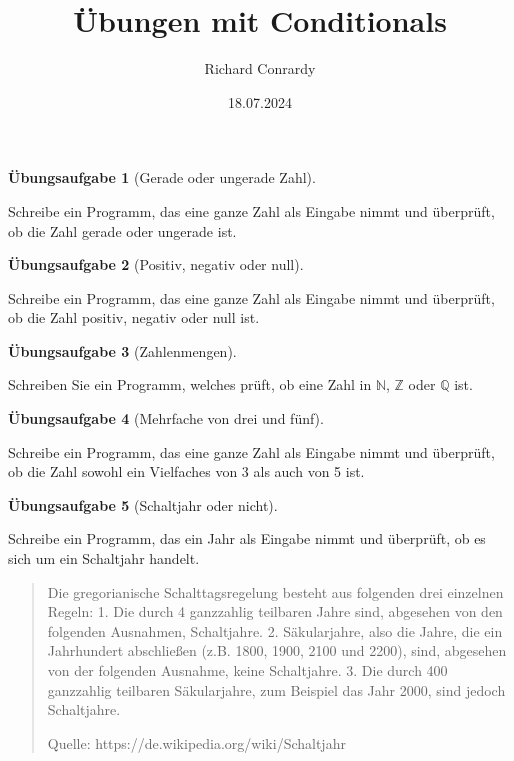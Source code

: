 \documentclass[
  10pt,
  a4paper,
  DIV=11]{scrartcl}
\title{Übungen mit Conditionals}
\author{Richard Conrardy}
\date{18.07.2024}
\theoremstyle{definition}
\newtheorem{exercise}{Übungsaufgabe}[section]
\theoremstyle{remark}
\begin{document}
\maketitle

\begin{exercise}[Gerade oder ungerade
Zahl]\protect\hypertarget{exr-line}{}\label{exr-line}

Schreibe ein Programm, das eine ganze Zahl als Eingabe nimmt und
überprüft, ob die Zahl gerade oder ungerade ist.

\end{exercise}

\begin{exercise}[Positiv, negativ oder
null]\protect\hypertarget{exr-line}{}\label{exr-line}

Schreibe ein Programm, das eine ganze Zahl als Eingabe nimmt und
überprüft, ob die Zahl positiv, negativ oder null ist.

\end{exercise}

\begin{exercise}[Zahlenmengen]\protect\hypertarget{exr-line}{}\label{exr-line}

Schreiben Sie ein Programm, welches prüft, ob eine Zahl in
\(\mathbb{N}\), \(\mathbb{Z}\) oder \(\mathbb{Q}\) ist.

\end{exercise}

\begin{exercise}[Mehrfache von drei und
fünf]\protect\hypertarget{exr-line}{}\label{exr-line}

Schreibe ein Programm, das eine ganze Zahl als Eingabe nimmt und
überprüft, ob die Zahl sowohl ein Vielfaches von 3 als auch von 5 ist.

\end{exercise}

\begin{exercise}[Schaltjahr oder
nicht]\protect\hypertarget{exr-line}{}\label{exr-line}

Schreibe ein Programm, das ein Jahr als Eingabe nimmt und überprüft, ob
es sich um ein Schaltjahr handelt.

\begin{quote}
Die gregorianische Schalttagsregelung besteht aus folgenden drei
einzelnen Regeln: 1. Die durch 4 ganzzahlig teilbaren Jahre sind,
abgesehen von den folgenden Ausnahmen, Schaltjahre. 2. Säkularjahre,
also die Jahre, die ein Jahrhundert abschließen (z.B. 1800, 1900, 2100
und 2200), sind, abgesehen von der folgenden Ausnahme, keine
Schaltjahre. 3. Die durch 400 ganzzahlig teilbaren Säkularjahre, zum
Beispiel das Jahr 2000, sind jedoch Schaltjahre.

Quelle: https://de.wikipedia.org/wiki/Schaltjahr
\end{quote}

\end{exercise}
\end{document}
